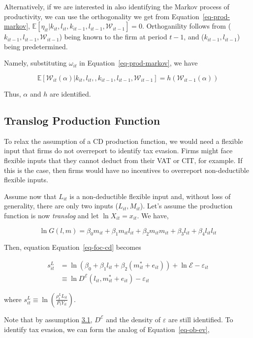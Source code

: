 \documentclass[
  12pt]{article}
\begin{document}
Alternatively, if we are interested in also identifying the Markov
process of productivity, we can use the orthogonality we get from
Equation~\ref{eq-prod-markov},
\(\mathbb{E}[\eta_{it}|k_{it},l_{it},k_{it-1},l_{it-1},\mathcal{W}_{it-1}]=0\).
Orthoganility follows from (\(k_{it-1},l_{it-1},\mathcal{W}_{it-1}\))
being known to the firm at period \(t-1\), and (\(k_{it-1},l_{it-1}\))
being predetermined.

Namely, substituting \(\omega_{it}\) in Equation~\ref{eq-prod-markov},
we have

\[
 \mathbb{E}[\mathcal{W}_{it}(\alpha)|k_{it},l_{it},,k_{it-1},l_{it-1},\mathcal{W}_{it-1}]=h(\mathcal{W}_{it-1}(\alpha))
\]

Thus, \(\alpha\) and \(h\) are identified.

\subsection{Translog Production
Function}\label{translog-production-function}

To relax the assumption of a CD production function, we would need a
flexible input that firms do not overreport to identify tax evasion.
Firms might face flexible inputs that they cannot deduct from their VAT
or CIT, for example. If this is the case, then firms would have no
incentives to overreport non-deductible flexible inputs.

Assume now that \(L_{it}\) is a non-deductible flexible input and,
without loss of generality, there are only two inputs
(\(L_{it}, M_{it}\)). Let's assume the production function is now
\emph{translog} and let \(\ln X_{it}=x_{it}\). We have,

\[
 \ln G(l,m)=\beta_0m_{it}+\beta_1m_{it}l_{it}+\beta_2m_{it}m_{it}+\beta_3l_{it}+\beta_4l_{it}l_{it}
\]

Then, equation Equation~\ref{eq-foc-cd} becomes

\[
\begin{aligned}
    s_{it}^{L}&=\ln \left(\beta_0+\beta_1l_{it}+\beta_2(m^*_{it}+e_{it})\right) + \ln \mathcal{E}- \varepsilon_{it} \\
    &\equiv \ln D^{\mathcal{E}}(l_{it},m^*_{it}+e_{it})- \varepsilon_{it} 
\end{aligned}
\]

where
\(s_{it}^{L} \equiv\ln\left(\frac{\rho^{L}_t L_{it}}{P_{t}Y_{it}}\right)\).

Note that by assumption \hyperref[ass-non-ev]{3.1}, \(D^{\mathcal{E}}\)
and the density of \(\varepsilon\) are still identified. To identify tax
evasion, we can form the analog of Equation~\ref{eq-ob-ev},
\end{document}
